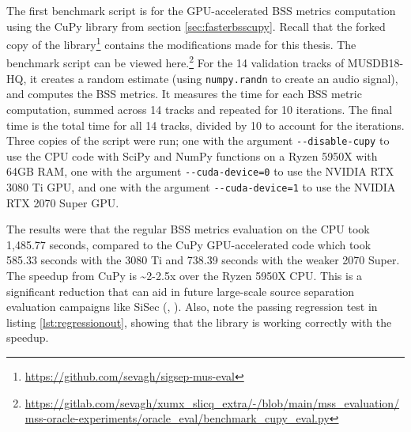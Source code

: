 \documentclass[report.tex]{subfiles}
\begin{document}
The first benchmark script is for the GPU-accelerated BSS metrics computation using the CuPy library from section \ref{sec:fasterbsscupy}. Recall that the forked copy of the library\footnote{\url{https://github.com/sevagh/sigsep-mus-eval}} contains the modifications made for this thesis. The benchmark script can be viewed here.\footnote{\url{https://gitlab.com/sevagh/xumx_slicq_extra/-/blob/main/mss_evaluation/mss-oracle-experiments/oracle_eval/benchmark_cupy_eval.py}} For the 14 validation tracks of MUSDB18-HQ, it creates a random estimate (using \Verb#numpy.randn# to create an audio signal), and computes the BSS metrics. It measures the time for each BSS metric computation, summed across 14 tracks and repeated for 10 iterations. The final time is the total time for all 14 tracks, divided by 10 to account for the iterations. Three copies of the script were run; one with the argument \Verb#--disable-cupy# to use the CPU code with SciPy and NumPy functions on a Ryzen 5950X with 64GB RAM, one with the argument \Verb#--cuda-device=0# to use the NVIDIA RTX 3080 Ti GPU, and one with the argument \Verb#--cuda-device=1# to use the NVIDIA RTX 2070 Super GPU.

The results were that the regular BSS metrics evaluation on the CPU took 1,485.77 seconds, compared to the CuPy GPU-accelerated code which took 585.33 seconds with the 3080 Ti and 738.39 seconds with the weaker 2070 Super. The speedup from CuPy is \textasciitilde 2-2.5x over the Ryzen 5950X CPU. This is a significant reduction that can aid in future large-scale source separation evaluation campaigns like SiSec (\cite{sisec2016}, \cite{sisec2018}). Also, note the passing regression test in listing \ref{lst:regressionout}, showing that the library is working correctly with the speedup.
\end{document}
